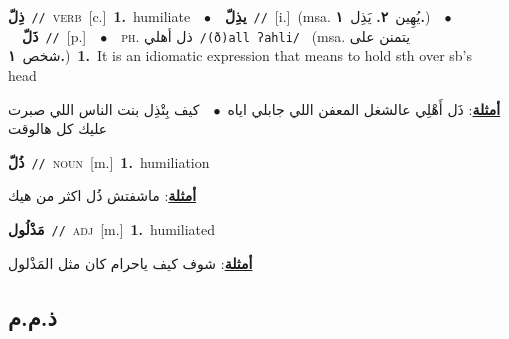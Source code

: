 \documentclass[10pt,a4paper,twoside]{article} %
\begin{document}
\begin{multicols}{2}
{{{{{{{{\setlength\topsep{0pt}\textbf{\foreignlanguage{arabic}{ذِلّ}}\ {\color{gray}\texttt{//}\color{black}}\ \textsc{verb}\ [c.]\ \textbf{1.}~humiliate\ \ $\bullet$\ \ \setlength\topsep{0pt}\textbf{\foreignlanguage{arabic}{يذِلّ}}\ {\color{gray}\texttt{//}\color{black}}\ [i.]\ \color{gray}(msa. \foreignlanguage{arabic}{يُهِين}~\foreignlanguage{arabic}{\textbf{٢.}}  \foreignlanguage{arabic}{يَذِل}~\foreignlanguage{arabic}{\textbf{١.}})\color{black}\ \ $\bullet$\ \ \setlength\topsep{0pt}\textbf{\foreignlanguage{arabic}{ذَلّ}}\ {\color{gray}\texttt{//}\color{black}}\ [p.]\ \ $\bullet$\ \ \textsc{ph.} \color{gray} \foreignlanguage{arabic}{ذل أهلي}\color{black}\ {\color{gray}\texttt{/{\sffamily (ð)all ʔahli}/}\color{black}}\ \color{gray} (msa. \foreignlanguage{arabic}{يتمنن على شخص}~\foreignlanguage{arabic}{\textbf{١.}})\color{black}\ \textbf{1.}~It is an idiomatic expression that means to hold sth over sb's head\  \begin{flushright}\color{gray}\foreignlanguage{arabic}{\textbf{\underline{\foreignlanguage{arabic}{أمثلة}}}: ذَل أَهْلِي عالشغل المعفن اللي جابلي اياه\ $\bullet$\ \  كيف بِتْذِل بنت الناس اللي صبرت عليك كل هالوقت}\end{flushright}\color{black}} \vspace{2mm}

{\setlength\topsep{0pt}\textbf{\foreignlanguage{arabic}{ذُلّ}}\ {\color{gray}\texttt{//}\color{black}}\ \textsc{noun}\ [m.]\ \textbf{1.}~humiliation\  \begin{flushright}\color{gray}\foreignlanguage{arabic}{\textbf{\underline{\foreignlanguage{arabic}{أمثلة}}}: ماشفتش ذُل اكثر من هيك}\end{flushright}\color{black}} \vspace{2mm}

{\setlength\topsep{0pt}\textbf{\foreignlanguage{arabic}{مَذْلُول}}\ {\color{gray}\texttt{//}\color{black}}\ \textsc{adj}\ [m.]\ \textbf{1.}~humiliated\  \begin{flushright}\color{gray}\foreignlanguage{arabic}{\textbf{\underline{\foreignlanguage{arabic}{أمثلة}}}: شوف كيف ياحرام كان مثل المَذْلول}\end{flushright}\color{black}} \vspace{2mm}

\vspace{-3mm}
\subsection*{\color{blue}\foreignlanguage{arabic}{ذ.م.م}\color{blue}{}} 

}}}}}}}
\end{multicols}
\end{document}
